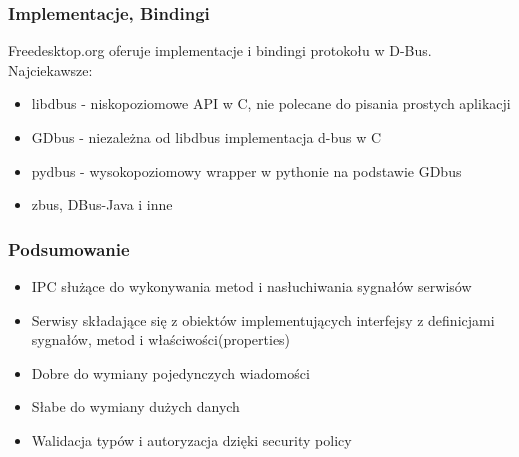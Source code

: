 \begin{frame}
    \frametitle{Implementacje, Bindingi}
    Freedesktop.org oferuje implementacje i bindingi protokołu w D-Bus. Najciekawsze:
    \begin{itemize}
        \item libdbus - niskopoziomowe API w C, nie polecane do pisania 
        prostych aplikacji
        \item GDbus - niezależna od libdbus implementacja d-bus w C
        \item pydbus - wysokopoziomowy wrapper w pythonie na podstawie GDbus
        \item zbus, DBus-Java i inne
    \end{itemize}
\end{frame}


\begin{frame}
    \frametitle{Podsumowanie}
    \begin{itemize}
        \item IPC służące do wykonywania metod 
        i nasłuchiwania sygnałów serwisów
        \item Serwisy składające się z obiektów implementujących interfejsy
        z definicjami sygnałów, metod i właściwości(properties)
        \item Dobre do wymiany pojedynczych wiadomości
        \item Słabe do wymiany dużych danych
        \item Walidacja typów i autoryzacja dzięki security policy
    \end{itemize}
\end{frame}